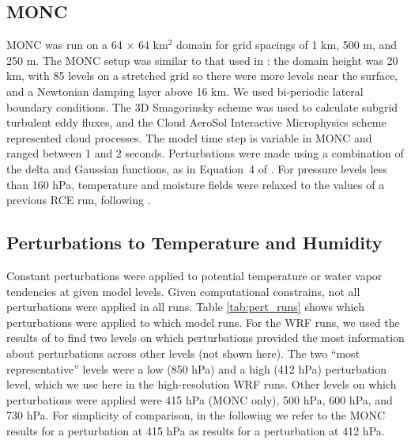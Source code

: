 \documentclass[draft]{agujournal2019}
\begin{document}
\subsection{MONC}

MONC was run on a 64 $\times$ 64 km$^2$ domain for grid spacings of 1 km, 500 m,
and 250 m. The MONC setup was similar to that used in :
the domain height was 20 km, with 85 levels on a stretched grid so there were
more levels near the surface, and a Newtonian damping layer above 16 km. We used
bi-periodic lateral boundary conditions. The 3D Smagorinsky scheme was used to
calculate subgrid turbulent eddy fluxes, and the Cloud AeroSol Interactive
Microphysics \cite<CASIM, see>{field23} scheme represented cloud processes. The
model time step is variable in MONC and ranged between 1 and 2 seconds.
Perturbations were made using a combination of the delta and Gaussian functions,
as in Equation~4 of . For pressure levels less than 160
hPa, temperature and moisture fields were relaxed to the values of a previous
RCE run, following \cite{Herman_JAMES_2013}.

\subsection{Perturbations to Temperature and Humidity}

Constant perturbations were applied to potential temperature or water vapor
tendencies at given model levels. Given computational constrains, not all
perturbations were applied in all runs.  Table \ref{tab:pert_runs} shows which
perturbations were applied to which model runs. For the WRF runs, we used the
results of  to find two levels on which perturbations
provided the most information about perturbations across other levels (not shown
here). The two ``most representative'' levels were a low (850 hPa) and a high
(412 hPa) perturbation level, which we use here in the high-resolution WRF runs.
Other levels on which perturbations were applied were 415 hPa (MONC only), 500
hPa, 600 hPa, and 730 hPa. For simplicity of comparison, in the following we
refer to the MONC results for a perturbation at 415 hPa as results for a
perturbation at 412 hPa.
\end{document}
